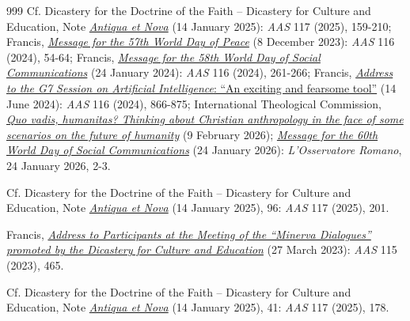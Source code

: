 \documentclass{article}
\begin{document}
\begin{thebibliography}{999}
 Cf. Dicastery for the Doctrine of the Faith -- Dicastery for Culture and Education, Note \href{https://www.vatican.va/roman_curia/congregations/cfaith/documents/rc_ddf_doc_20250128_antiqua-et-nova_en.html}{\emph{Antiqua et Nova}} (14 January 2025): \emph{AAS} 117 (2025), 159-210; Francis, \href{https://www.vatican.va/content/francesco/en/messages/peace/documents/20231208-messaggio-57giornatamondiale-pace2024.html}{\emph{Message for the 57th World Day of Peace}} (8 December 2023): \emph{AAS} 116 (2024), 54-64; Francis, \href{https://www.vatican.va/content/francesco/en/messages/communications/documents/20240124-messaggio-comunicazioni-sociali.html}{\emph{Message for the 58th World Day of Social Communications}} (24 January 2024): \emph{AAS} 116 (2024), 261-266; Francis, \href{https://www.vatican.va/content/francesco/en/speeches/2024/june/documents/20240614-g7-intelligenza-artificiale.html}{\emph{Address to the G7 Session on Artificial Intelligence}: ``An exciting and fearsome tool''} (14 June 2024): \emph{AAS} 116 (2024), 866-875; International Theological Commission, \href{https://www.vatican.va/roman_curia/congregations/cfaith/cti_documents/rc_cti_doc_20260304_quo-vadis-humanits_en.html}{\emph{Quo vadis, humanitas? Thinking about Christian anthropology in the face of some scenarios on the future of humanity}} (9 February 2026); \href{https://www.vatican.va/content/leo-xiv/en/messages/communications/documents/20260124-messaggio-comunicazioni-sociali.html}{\emph{Message for the 60th World Day of Social Communications}} (24 January 2026): \emph{L'Osservatore Romano}, 24 January 2026, 2-3.

 Cf. Dicastery for the Doctrine of the Faith -- Dicastery for Culture and Education, Note \href{https://www.vatican.va/roman_curia/congregations/cfaith/documents/rc_ddf_doc_20250128_antiqua-et-nova_en.html}{\emph{Antiqua et Nova}} (14 January 2025), 96: \emph{AAS} 117 (2025), 201.

 Francis, \href{https://www.vatican.va/content/francesco/en/speeches/2023/march/documents/20230327-minerva-dialogues.html}{\emph{Address to Participants at the Meeting of the ``Minerva Dialogues'' promoted by the Dicastery for Culture and Education}} (27 March 2023): \emph{AAS} 115 (2023), 465.

 Cf. Dicastery for the Doctrine of the Faith -- Dicastery for Culture and Education, Note \href{https://www.vatican.va/roman_curia/congregations/cfaith/documents/rc_ddf_doc_20250128_antiqua-et-nova_en.html}{\emph{Antiqua et Nova}} (14 January 2025), 41: \emph{AAS} 117 (2025), 178.


\end{thebibliography}
\end{document}
